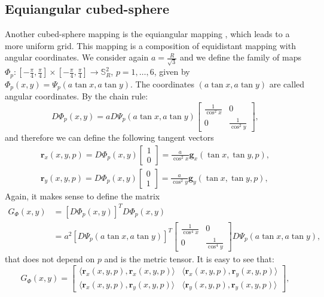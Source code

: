 \subsection{Equiangular cubed-sphere}
\label{equiangular-cs}
Another cubed-sphere mapping is the equiangular mapping \citep{ronchi:1996},
which leads to a more uniform grid.
This mapping is a composition of equidistant mapping with angular coordinates.
We consider again $a=\frac{R}{\sqrt{3}}$ and we define the family of maps
$\Phi_{p}: [-\frac{\pi}{4},\frac{\pi}{4}]  \times [-\frac{\pi}{4},\frac{\pi}{4}] 
\to \mathbb{S}^2_R$, $p=1, \ldots, 6$, given by $\Phi_{p}(x,y) = \Psi_{p}(a\tan{x},
a\tan{y})$.
The coordinates $(a\tan{x}, a\tan{y})$ are called angular coordinates.
By the chain rule:
\begin{equation*}
	D\Phi_{p}(x,y) = a
	D\Psi_{p}(a\tan{x}, a\tan{y})
	\begin{bmatrix}
		\frac{1}{\cos^2 x} & 0 \\ 
		0 & \frac{1}{\cos^2 y} 
	\end{bmatrix},
\end{equation*}
and therefore we can define the following tangent vectors
\begin{align}
    \label{chp4-tgvectors}
	\boldsymbol{r}_{x}(x,y,p) = D\Phi_{p}(x,y)
	\begin{bmatrix}
		 1 \\
		 0
	\end{bmatrix}
	= \frac{a}{\cos^2 x}
	\boldsymbol{g}_{x}(\tan{x}, \tan{y}, p)
	,\\
	\boldsymbol{r}_{y}(x, y ,p) = D\Phi_{p}(x,y)
	\begin{bmatrix}
		 0 \\
		 1
	\end{bmatrix}
	= \frac{a}{\cos^2 y}
	\boldsymbol{g}_{y}(\tan{x}, \tan{y}, p),
\end{align}
Again, it makes sense to define the matrix 
\begin{align*}
	G_{\Phi}(x,y) &= [D\Phi_{p}(x,y)]^TD\Phi_{p}(x,y) \\
	&= a^2
	[D\Psi_{p}(a\tan{x},a\tan{y})]^T
	\begin{bmatrix}
		\frac{1}{\cos^4 x} & 0 \\ 
		0 & \frac{1}{\cos^4 y} 
	\end{bmatrix}
	D\Psi_{p}(a\tan{x}, a\tan{y}),
\end{align*}
that does not depend on $p$ and is the  metric tensor.
It is easy to see that:
\begin{equation}
	\label{chp3-eqangle-phi-metric-tensor}
	G_{\Phi}(x,y) = 
	\begin{bmatrix}
		\langle \boldsymbol{r}_{x}(x,y,p), \boldsymbol{r}_{x}(x,y,p) \rangle & 
		\langle \boldsymbol{r}_{x}(x,y,p), \boldsymbol{r}_{y}(x,y,p) \rangle \\
		\langle \boldsymbol{r}_{x}(x,y,p), \boldsymbol{r}_{y}(x,y,p) \rangle  &
		\langle \boldsymbol{r}_{y}(x,y,p), \boldsymbol{r}_{y}(x,y,p) \rangle 
	\end{bmatrix},
\end{equation}
